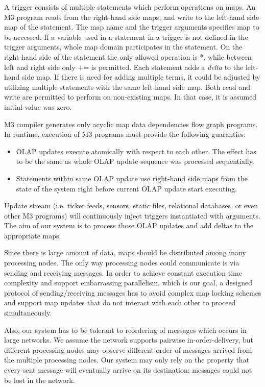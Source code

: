 \documentclass{sig-semester}
\def\OLAP{OLAP\xspace}
\def\M3{M3\xspace}
\begin{document}
A trigger consists of multiple statements which perform operations on maps. An \M3 program reads from the right-hand side maps, and write to the left-hand side map of the statement. The map name and the trigger arguments specifies map to be accessed. If a variable used in a statement in a trigger is not defined in the trigger arguments, whole map domain participates in the statement. On the right-hand side of the statement the only allowed operation is *, while between left and right side only += is permitted. Each statement adds a \textit{delta} to the left-hand side map. If there is need for adding multiple terms, it could be adjusted by utilizing multiple statements with the same left-hand side map. Both read and write are permitted to perform on non-existing maps. In that case, it is assumed initial value was zero.

\M3 compiler generates only acyclic map data dependencies flow graph programs. In runtime, execution of \M3 programs must provide the following guaranties:
\begin{itemize}
 \item \OLAP updates execute atomically with respect to each other. The effect has to be the same as whole \OLAP update sequence was processed sequentially.
 \item Statements within same \OLAP update use right-hand side maps from the state of the system right before current \OLAP update start executing.
\end{itemize}

Update stream (i.e. ticker feeds, sensors, static files, relational databases, or even other \M3 programs) will continuously inject triggers instantiated with arguments. The aim of our system is to process those \OLAP updates and add deltas to the appropriate maps.

Since there is large amount of data, maps should be distributed among many processing nodes. The only way processing nodes could communicate is via sending and receiving messages. In order to achieve constant execution time complexity and support embarrassing parallelism, which is our goal, a designed protocol of sending/receiving messages has to avoid complex map locking schemes and support map updates that do not interact with each other to proceed simultaneously.

Also, our system has to be tolerant to reordering of messages which occurs in large networks. We assume the network supports pairwise in-order-delivery, but different processing nodes may observe different order of messages arrived from the multiple processing nodes. Our system may only rely on the property that every sent message will eventually arrive on its destination; messages could not be lost in the network.
\end{document}
